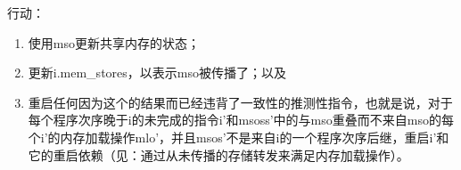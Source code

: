 行动：
\begin{enumerate}
\item 使用mso更新共享内存的状态；  %
\item 更新i.mem_stores，以表示mso被传播了；以及  %
\item 重启任何因为这个的结果而已经违背了一致性的推测性指令，也就是说，对于每个程序次序晚于i的未完成的指令i’和msoss’中的与mso重叠而不来自mso的每个i’的内存加载操作mlo’，并且msos’不是来自i的一个程序次序后继，重启i’和它的重启依赖（见：通过从未传播的存储转发来满足内存加载操作）。  %
\end{enumerate}


